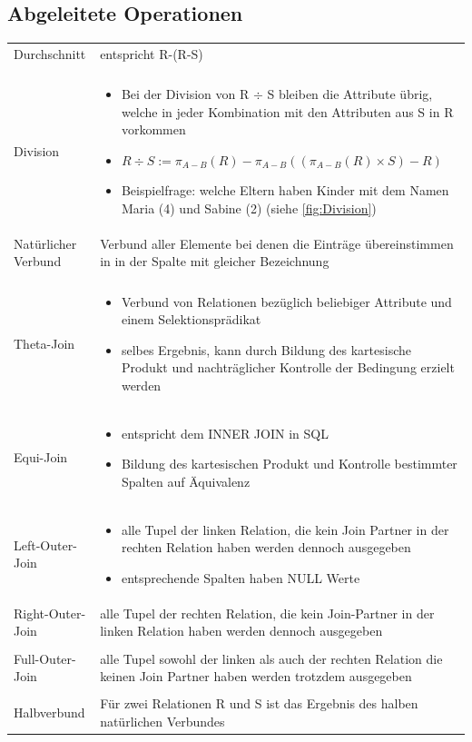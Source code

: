 \documentclass[a4paper]{article}
\begin{document}
\subsection{Abgeleitete Operationen}
\begin{tabular}{p{3.5cm} p{11cm}}
    Durchschnitt & entspricht R-(R-S) \\
    & \\
    Division & \begin{itemize}
        \item Bei der Division von R $\div$ S bleiben die Attribute übrig, welche in jeder Kombination mit den Attributen aus S in R vorkommen
        \item $R \div S := \pi_{A-B}(R) - \pi_{A-B} ((\pi_{A-B}(R) \times S) -R) $
        \item Beispielfrage: welche Eltern haben Kinder mit dem Namen Maria (4) und Sabine (2) (siehe \ref{fig:Division})
    \end{itemize}\\
    Natürlicher Verbund & Verbund aller Elemente bei denen die Einträge übereinstimmen in in der Spalte mit gleicher Bezeichnung \\
    & \\
    Theta-Join & \begin{itemize}
        \item Verbund von Relationen bezüglich beliebiger Attribute und einem Selektionsprädikat
        \item selbes Ergebnis, kann durch Bildung des kartesische Produkt und nachträglicher  Kontrolle der Bedingung erzielt werden
    \end{itemize}\\
    
    Equi-Join & \begin{itemize}
        \item entspricht dem INNER JOIN in SQL
        \item Bildung des kartesischen Produkt und Kontrolle bestimmter Spalten auf Äquivalenz
    \end{itemize}\\
    
    Left-Outer-Join & \begin{itemize}
        \item alle Tupel der linken Relation, die kein Join Partner in der rechten Relation haben werden dennoch ausgegeben
        \item entsprechende Spalten haben NULL Werte
    \end{itemize}\\
    
    Right-Outer-Join & alle Tupel der rechten Relation, die kein Join-Partner in der linken Relation haben werden dennoch ausgegeben \\
    & \\
    Full-Outer-Join & alle Tupel sowohl der linken als auch der rechten Relation die keinen Join Partner haben werden trotzdem ausgegeben \\
    & \\
    Halbverbund  & Für zwei Relationen R und S ist das Ergebnis des halben natürlichen Verbundes
\end{tabular}
\end{document}
